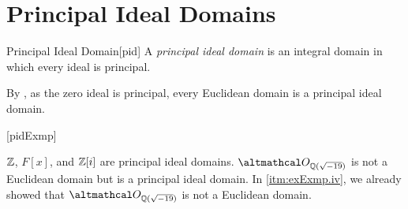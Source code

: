 \documentclass[../modern_algebra_2.tex]{subfiles}
\begin{document}
\section{Principal Ideal Domains}

\begin{Definition}{Principal Ideal Domain}[pid]
    A \emph{principal ideal domain} is an integral domain
    in which every ideal is principal.
\end{Definition}

\begin{note}
    By , as the zero ideal is principal,
    every Euclidean domain is a principal ideal domain.
\end{note}

\begin{Example}{}[pidExmp]
\begin{enumerate}[label=(\roman*), ref=\protect{\Cref{exmp:pidExmp} (\roman*)}]
    \ii
    \(\ZZ\), \(F[x]\), and \(\ZZ{}[i]\) are principal ideal domains.
    \ii
    \(\rqi{\sqrt{-19}}\) is not a Euclidean domain but is a principal ideal domain.
    In \ref{itm:exExmp.iv}, we already showed that \(\rqi{\sqrt{-19}}\) is not a Euclidean domain.


\end{enumerate}
\end{Example}
\end{document}
